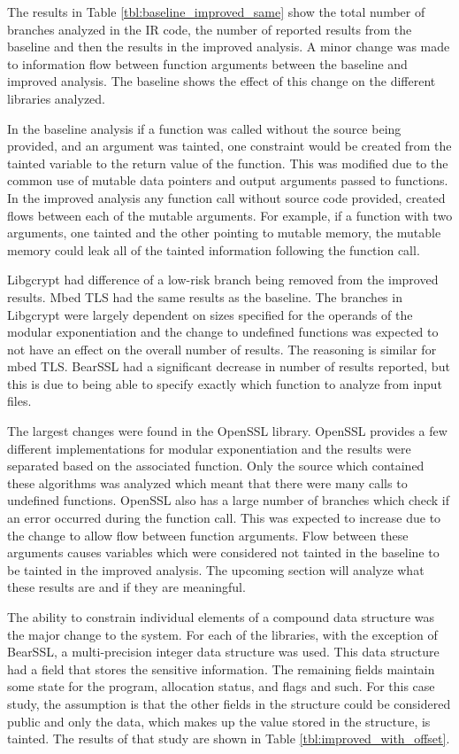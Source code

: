 \documentclass[11pt,a4paper]{article}
\begin{document}
 The results in Table \ref{tbl:baseline_improved_same} show the total number of
 branches analyzed in the IR code, the number of reported results from the
 baseline and then the results in the improved analysis. A minor change was made
 to information flow between function arguments between the baseline and
 improved analysis. The baseline shows the effect of this change on the
 different libraries analyzed.

 In the baseline analysis if a function was called without the source being
 provided, and an argument was tainted, one constraint would be created from the
 tainted variable to the return value of the function. This was modified due to
 the common use of mutable data pointers and output arguments passed to
 functions. In the improved analysis any function call without source code
 provided, created flows between each of the mutable arguments. For example, if
 a function with two arguments, one tainted and the other pointing to mutable
 memory, the mutable memory could leak all of the tainted information following
 the function call.

 Libgcrypt had difference of a low-risk branch being removed from the improved
 results. Mbed TLS had the same results as the baseline. The branches in
 Libgcrypt were largely dependent on sizes specified for the operands of the
 modular exponentiation and the change to undefined functions was expected to
 not have an effect on the overall number of results. The reasoning is similar
 for mbed TLS. BearSSL had a significant decrease in number of results reported,
 but this is due to being able to specify exactly which function to analyze from
 input files.

 The largest changes were found in the OpenSSL library. OpenSSL provides a few
 different implementations for modular exponentiation and the results were
 separated based on the associated function. Only the source which contained
 these algorithms was analyzed which meant that there were many calls to
 undefined functions. OpenSSL also has a large number of branches which check
 if an error occurred during the function call. This was expected to increase due
 to the change to allow flow between function arguments. Flow between these
 arguments causes variables which were considered not tainted in the baseline to
 be tainted in the improved analysis. The upcoming section will analyze what
 these results are and if they are meaningful. 


 The ability to constrain individual elements of a compound data structure was
 the major change to the system. For each of the libraries, with the exception
 of BearSSL, a multi-precision integer data structure was used. This data
 structure had a field that stores the sensitive information. The remaining
 fields maintain some state for the program, allocation status, and flags and
 such. For this case study, the assumption is that the other fields in the
 structure could be considered public and only the data, which makes up the value
 stored in the structure, is tainted. The results of that study are shown in
 Table \ref{tbl:improved_with_offset}.
\end{document}
